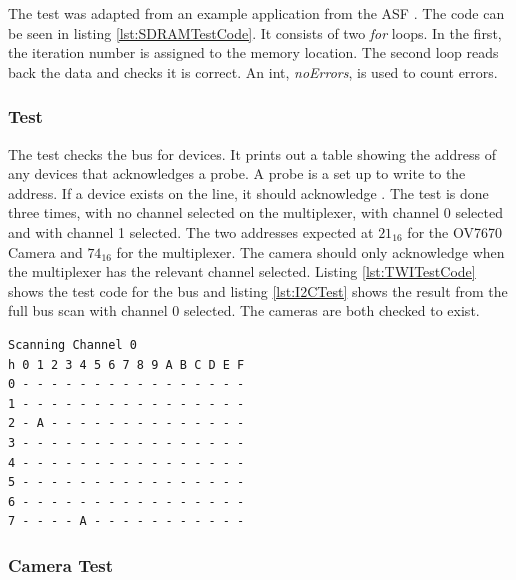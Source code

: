 The test was adapted from an example application from the ASF \citep{Atmel:ASF}. The code can be seen in listing \ref{lst:SDRAMTestCode}. It consists of two \textit{for} loops. In the first, the iteration number is assigned to the memory location. The second loop reads back the data and checks it is correct. An int, \textit{noErrors}, is used to count errors. 



\subsubsection{\itc Test}\label{I2C:Test}
The \itc test checks the bus for devices. It prints out a table showing the address of any devices that acknowledges a probe. A probe is a set up to write to the address. If a device exists on the line, it should acknowledge \citep{Philips:I2C}. The test is done three times, with no channel selected on the \itc multiplexer, with channel 0 selected and with channel 1 selected. The two addresses expected at $21_{16}$ for the OV7670 Camera and $74_{16}$ for the \itc multiplexer. The camera should only acknowledge when the \itc multiplexer has the relevant channel selected. Listing \ref{lst:TWITestCode} shows the test code for the \itc bus and listing \ref{lst:I2CTest} shows the result from the full bus scan with channel 0 selected. The cameras are both checked to exist.


\begin{lstlisting}[caption={Result of \itc bus scan with Channel 0 of the \itc multiplexer selected},label={lst:I2CTest}]
Scanning Channel 0
h 0 1 2 3 4 5 6 7 8 9 A B C D E F
0 - - - - - - - - - - - - - - - -
1 - - - - - - - - - - - - - - - -
2 - A - - - - - - - - - - - - - -
3 - - - - - - - - - - - - - - - -
4 - - - - - - - - - - - - - - - -
5 - - - - - - - - - - - - - - - -
6 - - - - - - - - - - - - - - - -
7 - - - - A - - - - - - - - - - -
\end{lstlisting}

\subsubsection{Camera Test}\label{Camera:Test}

